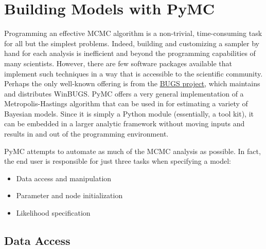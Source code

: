 \documentclass[]{book}
\begin{document}
\chapter{Building Models with PyMC}

Programming an effective MCMC algorithm is a non-trivial, time-consuming task for all but the simplest problems. Indeed, building and customizing a sampler by hand for each analysis is inefficient and beyond the programming capabilities of many scientists. However, there are few software packages available that implement such techniques in a way that is accessible to the scientific community. Perhaps the only well-known offering is from the \href{http://www.mrc-bsu.cam.ac.uk/bugs/}{BUGS project}, which maintains and distributes WinBUGS. PyMC offers a very general implementation of a Metropolis-Hastings algorithm that can be used in for estimating a variety of Bayesian models. Since it is simply a Python module (essentially, a tool kit), it can be embedded in a larger analytic framework without moving inputs and results in and out of the programming environment. 

PyMC attempts to automate as much of the MCMC analysis as possible. In fact, the end user is responsible for just three tasks when specifying a model:
\begin{itemize}

	\item Data access and manipulation 

	\item Parameter and node initialization

	\item Likelihood specification
	
\end{itemize}

\section{Data Access}\label{sec:data_access}
\end{document}
